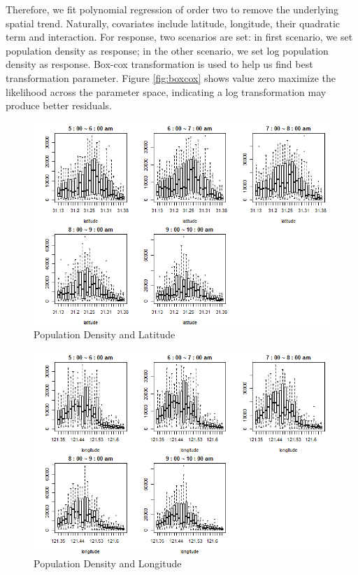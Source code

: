 \documentclass[hidelinks,12pt]{article}
\begin{document}
	Therefore, we fit polynomial regression of order two to remove the underlying spatial trend. Naturally, covariates include latitude, longitude, their quadratic term and interaction. For response, two scenarios are set: in first scenario, we set population density as response; in the other scenario, we set log population density as response. Box-cox transformation is used to help us find best transformation parameter. Figure \ref{fig:boxcox} shows value zero maximize the likelihood across the parameter space, indicating a log transformation may produce better residuals.
	\begin{figure}[!ht]
		\includegraphics[width=\textwidth]{lat.png}
		\caption{Population Density and Latitude\label{fig:lat}}
	\end{figure}
	\FloatBarrier
	
	\begin{figure}[!ht]
		\includegraphics[width=\textwidth]{long.png}
		\caption{Population Density and Longitude\label{fig:long}}
	\end{figure}
	\FloatBarrier
	 
\end{document}
